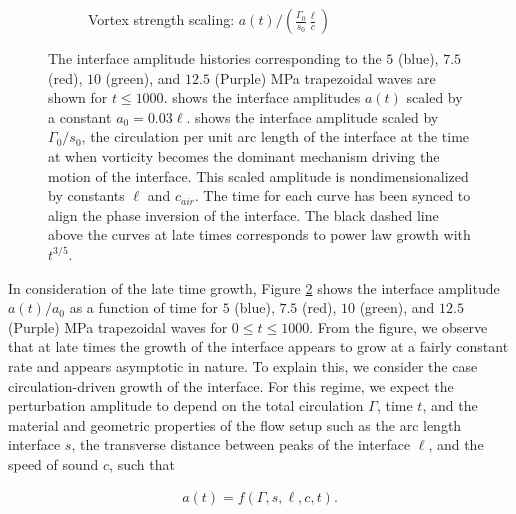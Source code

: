 \begin{figure}
\begin{subfigure}[t]{0.45\textwidth}
    \caption{\label{fig:trapz_interface_t1000_scaled} Vortex strength scaling: $a(t)/\left(\frac{\Gamma_0}{s_0}\frac{\ell}{c}\right)$}
  \end{subfigure}
  \caption[The interface amplitude at long time]{The interface
    amplitude histories corresponding to the $5$ (blue), $7.5$ (red),
    $10$ (green), and $12.5$ (Purple) MPa trapezoidal waves are shown
    for $t\leq 1000$.  shows the
    interface amplitudes $a(t)$ scaled by a constant
    $a_0=0.03\ell$. \protect{}
    shows the interface amplitude scaled by $\Gamma_0/s_0$, the
    circulation per unit arc length of the interface at the time at
    when vorticity becomes the dominant mechanism driving the motion
    of the interface. This scaled amplitude is nondimensionalized by
    constants $\ell$ and $c_{air}$. The time for each curve has been
    synced to align the phase inversion of the interface. The black
    dashed line above the curves at late times corresponds to power
    law growth with $t^{3/5}$.}
  \label{fig:trapz_interface_loglog}
\end{figure}

In consideration of the late time growth, Figure
\ref{fig:trapz_interface_loglog} shows the interface amplitude
$a(t)/a_0$ as a function of time for $5$ (blue), $7.5$ (red), $10$
(green), and $12.5$ (Purple) MPa trapezoidal waves for
$0 \leq t\leq 1000$. From the figure, we observe that at late times
the growth of the interface appears to grow at a fairly constant rate
and appears asymptotic in nature. To explain this, we consider the
case circulation-driven growth of the interface. For this regime, we
expect the perturbation amplitude to depend on the total circulation
$\Gamma$, time $t$, and the material and geometric properties of the
flow setup such as the arc length interface $s$, the transverse
distance between peaks of the interface $\ell$, and the speed of sound
$c$, such that

\begin{align}
  \label{eq:dimensional_amplitude}
  a(t)=f\left(\Gamma, s, \ell, c, t\right).
\end{align}

